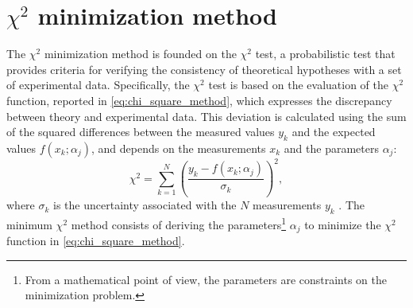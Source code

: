 \appendix
\renewcommand{\chaptermark}[1]{%
	\markboth{\MakeUppercase{APPENDIX\ \thechapter\ --\ #1}}{}
}
\raggedbottom %
\chapter{\texorpdfstring{$\chi^2$}{χ²} minimization method}\label{ch:chi_squared_min}
The $\chi^2$ minimization method is founded on the $\chi^2$ test, a probabilistic test that provides criteria for verifying the consistency of theoretical hypotheses with a set of experimental data. Specifically, the $\chi^2$ test is based on the evaluation of the $\chi^2$ function, reported in \autoref{eq:chi_square_method}, which expresses the discrepancy between theory and experimental data. This deviation is calculated using the sum of the squared differences between the measured values $y_k$ and the expected values $f\left(x_k;\alpha_j\right)$, and depends on the measurements $x_k$ and the parameters $\alpha_j$:
\begin{equation}
	\chi^2=\sum_{k=1}^N\left(\frac{y_k-f\left(x_k;\alpha_j\right)}{\sigma_k}\right)^2,
	\label{eq:chi_square_method}
\end{equation}
where $\sigma_k$ is the uncertainty associated with the $N$ measurements $y_k$ \cite{Fornasini2008}. The minimum $\chi^2$ method consists of deriving the parameters\footnote{From a mathematical point of view, the parameters are constraints on the minimization problem.} $\alpha_j$ to minimize the $\chi^2$ function in \autoref{eq:chi_square_method}.

